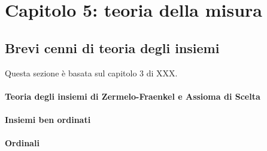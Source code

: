 \section{Capitolo 5: teoria della misura}
\subsection{Brevi cenni di teoria degli insiemi}
Questa sezione è basata sul capitolo 3 di XXX.\\
\paragraph{Teoria degli insiemi di Zermelo-Fraenkel e Assioma di Scelta}
\paragraph{Insiemi ben ordinati}
\paragraph{Ordinali}
